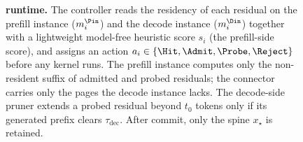 \begin{figure}[t]
\centering
\resizebox{0.78\textwidth}{!}{}
\caption{\textbf{\sys{} runtime.}
The controller reads the residency of each residual on the prefill instance ($m_i^{\Pin}$) and the decode instance ($m_i^{\Din}$) together with a lightweight model-free heuristic score $s_i$ (the prefill-side score), and assigns an action $a_i\in\{\Hit,\Admit,\Probe,\Reject\}$ before any kernel runs.
The prefill instance computes only the non-resident suffix of admitted and probed residuals; the connector carries only the pages the decode instance lacks.
The decode-side pruner extends a probed residual beyond $t_0$ tokens only if its generated prefix clears $\tau_{\mathrm{dec}}$.
After commit, only the spine $x_\star$ is retained.}
\label{fig:system}
\end{figure}



